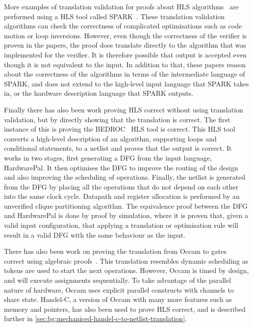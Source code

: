 More examples of translation validation for proofs about HLS
algorithms~\cite{karfa06_formal_verif_method_sched_high_synth,
  karfa07_hand_verif_high_synth, kundu07_autom,
  karfa08_equiv_check_method_sched_verif, kundu08_valid_high_level_synth,
  karfa10_verif_datap_contr_gener_phase, karfa12_formal_verif_code_motion_techn,
  chouksey19_trans_valid_code_motion_trans_invol_loops,
  chouksey20_verif_sched_condit_behav_high_level_synth} are performed using a
HLS tool called SPARK~\cite{gupta03_spark}.  These translation validation
algorithms can check the correctness of complicated optimisations such as code
motion or loop inversions.  However, even though the correctness of the verifier
is proven in the papers, the proof does translate directly to the algorithm that
was implemented for the verifier.  It is therefore possible that output is
accepted even though it is not equivalent to the input.  In addition to that,
these papers reason about the correctness of the algorithms in terms of the
intermediate language of SPARK, and does not extend to the high-level input
language that SPARK takes in, or the hardware description language that SPARK
outputs.

Finally there has also been work proving HLS correct without using translation
validation, but by directly showing that the translation is correct.  The first
instance of this is proving the BEDROC~\cite{chapman92_verif_bedroc} HLS tool is
correct.  This HLS tool converts a high-level description of an algorithm,
supporting loops and conditional statements, to a netlist and proves that the
output is correct.  It works in two stages, first generating a DFG from the
input language, HardwarePal.  It then optimises the DFG to improve the routing
of the design and also improving the scheduling of operations.  Finally, the
netlist is generated from the DFG by placing all the operations that do not
depend on each other into the same clock cycle.  Datapath and register
allocation is performed by an unverified clique partitioning algorithm.  The
equivalence proof between the DFG and HardwarePal is done by proof by
simulation, where it is proven that, given a valid input configuration, that
applying a translation or optimisation rule will result in a valid DFG with the
same behaviour as the input.

There has also been work on proving the translation from Occam to
gates~\cite{page91_compil_occam} correct using algebraic
proofs~\cite{jifeng93_towar}.  This translation resembles dynamic scheduling as
tokens are used to start the next operations.  However, Occam is timed by
design, and will execute assignments sequentially.  To take advantage of the
parallel nature of hardware, Occam uses explicit parallel constructs with
channels to share state.  Handel-C, a version of Occam with many more features
such as memory and pointers, has also been used to prove HLS correct, and is
described further in \cref{sec:bg:mechaniced-handel-c-to-netlist-translation}.

